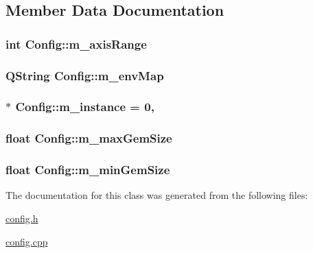 \subsection{Member Data Documentation}
\hypertarget{class_config_a5f172b706977841fdcb91351eeae817e}{
\subsubsection[{m\+\_\+axis\+Range}]{\setlength{\rightskip}{0pt plus 5cm}int Config\+::m\+\_\+axis\+Range\hspace{0.3cm}{\ttfamily [protected]}}}\label{class_config_a5f172b706977841fdcb91351eeae817e}
\hypertarget{class_config_a70804accd579749b776f9c0c3e5c000b}{
\subsubsection[{m\+\_\+env\+Map}]{\setlength{\rightskip}{0pt plus 5cm}Q\+String Config\+::m\+\_\+env\+Map\hspace{0.3cm}{\ttfamily [protected]}}}\label{class_config_a70804accd579749b776f9c0c3e5c000b}
\hypertarget{class_config_af8e6282b4a10e5bce08419395394581b}{
\subsubsection[{m\+\_\+instance}]{ $\ast$ Config\+::m\+\_\+instance = 0\hspace{0.3cm}{\ttfamily [static]}, {\ttfamily [protected]}}}\label{class_config_af8e6282b4a10e5bce08419395394581b}
\hypertarget{class_config_ae8a0c3906a4d18952a7fbb00868c963e}{
\subsubsection[{m\+\_\+max\+Gem\+Size}]{\setlength{\rightskip}{0pt plus 5cm}float Config\+::m\+\_\+max\+Gem\+Size\hspace{0.3cm}{\ttfamily [protected]}}}\label{class_config_ae8a0c3906a4d18952a7fbb00868c963e}
\hypertarget{class_config_a7284f245054875419777e7cbad67183c}{
\subsubsection[{m\+\_\+min\+Gem\+Size}]{\setlength{\rightskip}{0pt plus 5cm}float Config\+::m\+\_\+min\+Gem\+Size\hspace{0.3cm}{\ttfamily [protected]}}}\label{class_config_a7284f245054875419777e7cbad67183c}


The documentation for this class was generated from the following files\+:\begin{DoxyCompactItemize}
\item 
\hyperlink{config_8h}{config.\+h}\item 
\hyperlink{config_8cpp}{config.\+cpp}\end{DoxyCompactItemize}
